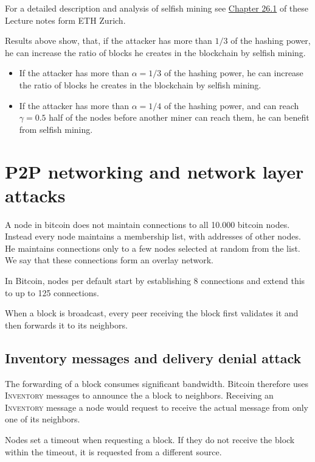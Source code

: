 For a detailed description and analysis of selfish mining see 
 \href{https://disco.ethz.ch/courses/distsys/lnotes/chapter26.pdf}{Chapter 26.1} of these Lecture notes form ETH Zurich.
 
\begin{note}
Results above show, that, if the attacker has more than $1/3$ of the hashing power, he can increase the ratio of blocks he creates in the blockchain by selfish mining.

\begin{itemize}
	\item If the attacker has more than $\alpha=1/3$ of the hashing power, he can increase the ratio of blocks he creates in the blockchain by selfish mining.
	\item If the attacker has more than $\alpha=1/4$ of the hashing power, and can reach $\gamma=0.5$ half of the nodes before another miner can reach them, he can benefit from selfish mining.
\end{itemize}
\end{note}

\section{P2P networking and network layer attacks}
A node in bitcoin does not maintain connections to all 10.000 bitcoin nodes.
Instead every node maintains a membership list, with addresses of other nodes. He maintains connections only to a few nodes selected at random from the list. 
We say that these connections form an overlay network.

In Bitcoin, nodes per default start by establishing 8 connections and extend this to up to 125 connections.

When a block is broadcast, every peer receiving the block first validates it and then forwards it to its neighbors. 

\subsection{Inventory messages and delivery denial attack}
The forwarding of a block consumes significant bandwidth. 
Bitcoin therefore uses \textsc{Inventory} messages to announce the a block to neighbors. Receiving an \textsc{Inventory} message a node would request to receive the actual message from only one of its neighbors. 

Nodes set a timeout when requesting a block. If they do not receive the block within the timeout, it is requested from a different source.


